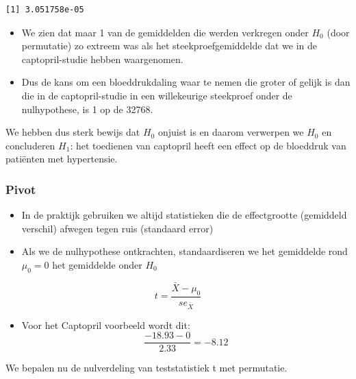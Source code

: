 \documentclass[
  dutch,
  letterpaper,
  12pt]{book}
\newenvironment{Shaded}{\begin{snugshade}}{\end{snugshade}}
\newcommand{\FunctionTok}[1]{\textcolor[rgb]{0.28,0.35,0.67}{#1}}
\newcommand{\NormalTok}[1]{\textcolor[rgb]{0.00,0.23,0.31}{#1}}
\newcommand{\SpecialCharTok}[1]{\textcolor[rgb]{0.37,0.37,0.37}{#1}}
\providecommand{\tightlist}{%
  \setlength{\itemsep}{0pt}\setlength{\parskip}{0pt}}
\theoremstyle{definition}
\theoremstyle{definition}
\theoremstyle{definition}
\theoremstyle{remark}
\begin{document}
\begin{Shaded}
\end{Shaded}

\begin{verbatim}
[1] 3.051758e-05
\end{verbatim}

\begin{itemize}
\item
  We zien dat maar 1 van de gemiddelden die werden verkregen onder
  \(H_0\) (door permutatie) zo extreem was als het steekproefgemiddelde
  dat we in de captopril-studie hebben waargenomen.
\item
  Dus de kans om een bloeddrukdaling waar te nemen die groter of gelijk
  is dan die in de captopril-studie in een willekeurige steekproef onder
  de nulhypothese, is 1 op de 32768.
\end{itemize}

We hebben dus sterk bewijs dat \(H_0\) onjuist is en daarom verwerpen we
\(H_0\) en concluderen \(H_1\): het toedienen van captopril heeft een
effect op de bloeddruk van patiënten met hypertensie.

\subsubsection{Pivot}\label{pivot}

\begin{itemize}
\item
  In de praktijk gebruiken we altijd statistieken die de effectgrootte
  (gemiddeld verschil) afwegen tegen ruis (standaard error)
\item
  Als we de nulhypothese ontkrachten, standaardiseren we het gemiddelde
  rond \(\mu_0 = 0\) het gemiddelde onder \(H_0\)
\end{itemize}

\[t=\frac{\bar X-\mu_0}{se_{\bar X}}\]

\begin{itemize}
\tightlist
\item
  Voor het Captopril voorbeeld wordt dit:
  \[\frac{-18.93-0}{2.33}=-8.12\]
\end{itemize}

We bepalen nu de nulverdeling van teststatistiek t met permutatie.
\end{document}

